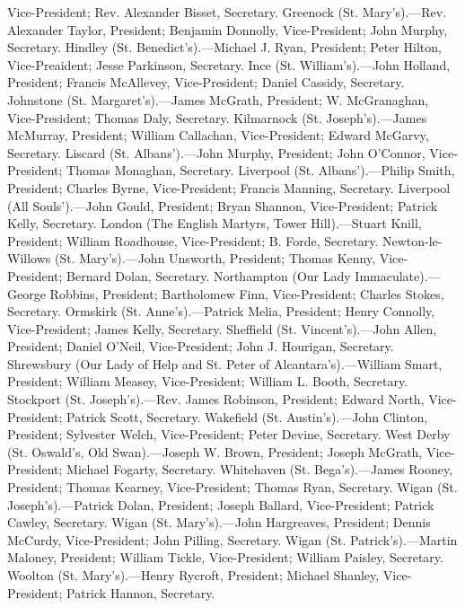 Vice-President; Rev. Alexander Bisset, Secretary. Greenock (St. Mary's).—Rev.
Alexander Taylor, President; Benjamin Donnolly, Vice-President; John
Murphy, Secretary. Hindley (St. Benedict's).—Michael J. Ryan,
President; Peter Hilton, Vice-Preaident; Jesse Parkinson, Secretary.
Ince (St. William's).—John Holland, President; Francis McAllevey,
Vice-President; Daniel Cassidy, Secretary. Johnstone (St. Margaret's).—James
McGrath, President; W. McGranaghan, Vice-President; Thomas Daly,
Secretary. Kilmarnock (St. Joseph's).—James McMurray, President;
William Callachan, Vice-President; Edward McGarvy, Secretary. Liscard
(St. Albans').—John Murphy, President; John O'Connor,
Vice-President; Thomas Monaghan, Secretary. Liverpool (St. Albans').—Philip
Smith, President; Charles Byrne,
Vice-President; Francis Manning, Secretary. Liverpool (All Souls').—John
Gould, President; Bryan Shannon, Vice-President; Patrick Kelly,
Secretary. London (The English Martyrs, Tower Hill).—Stuart Knill,
President; William Roadhouse, Vice-President; B. Forde, Secretary.
Newton-le-Willows (St. Mary's).—John Unsworth, President; Thomas
Kenny, Vice-President; Bernard Dolan, Secretary. Northampton (Our Lady
Immaculate).—George Robbins, President; Bartholomew Finn,
Vice-President; Charles Stokes, Secretary. Ormskirk (St. Anne's).—Patrick
Melia, President; Henry Connolly, Vice-President; James Kelly,
Secretary. Sheffield (St. Vincent's).—John Allen, President; Daniel
O'Neil, Vice-President; John J. Hourigan, Secretary. Shrewsbury (Our
Lady of Help and St. Peter of Alcantara's).—William Smart,
President; William Measey, Vice-President; William L. Booth,
Secretary. Stockport (St. Joseph's).—Rev. James Robinson, President;
Edward North, Vice-President; Patrick Scott, Secretary. Wakefield (St.
Austin's).—John Clinton, President; Sylvester Welch, Vice-President;
Peter Devine, Secretary. West Derby (St. Oswald's, Old Swan).—Joseph
W. Brown, President; Joseph McGrath, Vice-President; Michael Fogarty,
Secretary. Whitehaven (St. Bega's).—James Rooney, President; Thomas
Kearney, Vice-President; Thomas Ryan, Secretary. Wigan (St. Joseph's).—Patrick
Dolan, President; Joseph Ballard, Vice-President; Patrick Cawley,
Secretary. Wigan (St. Mary's).—John Hargreaves, President; Dennis
McCurdy, Vice-President; John Pilling, Secretary. Wigan (St. Patrick's).—Martin
Maloney, President; William Tickle, Vice-President; William Paisley,
Secretary. Woolton (St. Mary's).—Henry Rycroft, President; Michael
Shanley, Vice-President; Patrick Hannon, Secretary.


